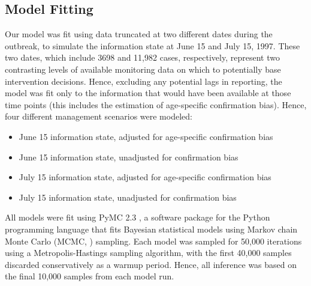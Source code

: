 \subsection{Model Fitting}\label{model-fitting}

Our model was fit using data truncated at two different dates during the
outbreak, to simulate the information state at June 15 and July 15,
1997. These two dates, which include 3698 and 11,982 cases,
respectively, represent two contrasting levels of available monitoring
data on which to potentially base intervention decisions. Hence,
excluding any potential lags in reporting, the model was fit only to the
information that would have been available at those time points (this
includes the estimation of age-specific confirmation bias). Hence, four
different management scenarios were modeled:

\begin{itemize}
\item June 15 information state, adjusted for age-specific confirmation bias
\item June 15 information state, unadjusted for confirmation bias
\item July 15 information state, adjusted for age-specific confirmation bias
\item July 15 information state, unadjusted for confirmation bias
\end{itemize}

All models were fit using PyMC 2.3 \cite{Patil_2010},
a software package for the Python programming language that fits
Bayesian statistical models using Markov chain Monte Carlo (MCMC, \cite{Geyer_2011}) sampling. Each model was sampled for 50,000
iterations using a Metropolis-Hastings sampling algorithm, with the
first 40,000 samples discarded conservatively as a warmup period. Hence,
all inference was based on the final 10,000 samples from each model run.